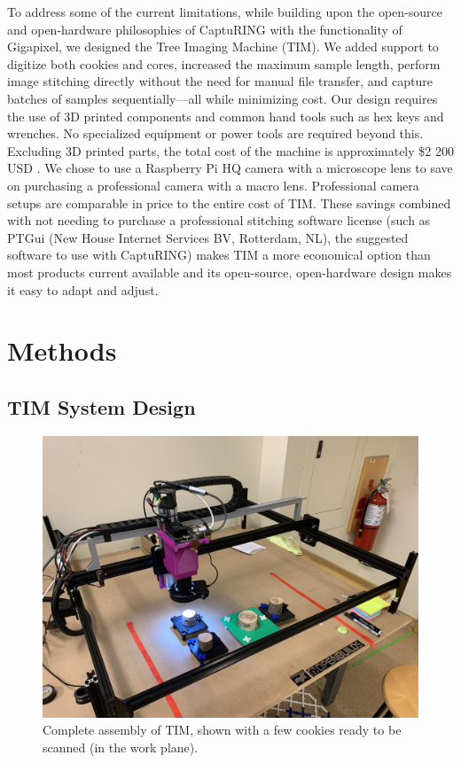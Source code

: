 \documentclass[a4paper,12pt]{article}
\begin{document}
To address some of the current limitations, while building upon the open-source and open-hardware philosophies of CaptuRING with the functionality of Gigapixel, we designed the Tree Imaging Machine (TIM).
We added support to digitize both cookies and cores, increased the maximum sample length, perform image stitching directly without the need for manual file transfer, and capture batches of samples sequentially---all while minimizing cost.
Our design requires the use of 3D printed components and common hand tools such as hex keys and wrenches. No specialized equipment or power tools are required beyond this. 
Excluding 3D printed parts, the total cost of the machine is approximately \$2 200 USD \citep[compared to the \$70 000 USD of the Gigapixel,][]{griffin_gigapixel_2021}.
We chose to use a Raspberry Pi HQ camera with a microscope lens to save on purchasing a professional camera with a macro lens. Professional camera setups are comparable in price to the entire cost of TIM.
These savings combined with not needing to purchase a professional stitching software license (such as PTGui (New House Internet Services BV, Rotterdam, NL), the suggested software to use with CaptuRING) makes TIM a more economical option than most products current available and its open-source, open-hardware design makes it easy to adapt and adjust. %

\section{Methods}

\subsection{TIM System Design} %

\begin{figure}
  \centering
  \includegraphics[height=0.5\linewidth]{../content/tina.jpg}
  \caption{Complete assembly of TIM, shown with a few cookies ready to be scanned (in the work plane).}
  \label{fig:tim_assembled}
\end{figure}
\end{document}
